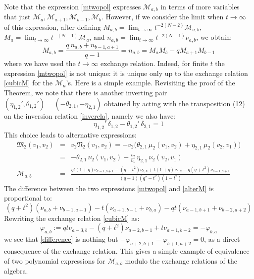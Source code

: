Note that the expression \eqref{mtwopol} expresses ${\mathcal M}_{a,b}$ in terms of more variables that 
just ${\mathcal M}_a,{\mathcal M}_{a+1},{\mathcal M}_{b-1},{\mathcal M}_{b}$. However, if we consider the limit
when $t\to \infty$ of this expression, after defining $M_{a,b}=\lim_{t\to \infty} t^{-2(N-2)}{\mathcal M}_{a,b}$,
$M_a=\lim_{t\to \infty} t^{-(N-1)} {\mathcal M}_a$, and $n_{a,b}=\lim_{t\to \infty} t^{-2(N-1)} \nu_{a,b}$, we obtain:
$$M_{a,b}=\frac{q \ n_{a,b}+n_{b-1,a+1}}{q-1}=n_{a,b}=M_aM_b-q M_{a+1}M_{b-1}$$
where we have used the $t\to \infty$ exchange relation. 
Indeed, for finite $t$ the expression \eqref{mtwopol} is not unique: 
it is unique only up to the exchange relation \eqref{cubicM}
for the ${\mathcal M}_n$'s. Here is a simple example.
Revisiting the proof of the Theorem, we note that there is another 
inverting pair $(\eta_{1,2}',\theta_{1,2}')=(-\theta_{2,1},-\eta_{2,1})$ obtained by acting with the transposition (12) 
on the inversion relation \eqref{inverela}, namely we also have:
$$\eta_{1,2}'\, \delta_{1,2}-\theta_{1,2}' \, \delta_{2,1}=1$$
This choice leads to alternative expressions:
\begin{eqnarray}
{\mathfrak M}_2(v_1,v_2)&=& v_2 {\mathfrak N}_2(v_1,v_2)=-v_2\Big(\theta_{2,1}\, \mu_2(v_1,v_2)+\eta_{2,1}\, \mu_2(v_2,v_1)\Big)\nonumber \\
&=& -\theta_{2,1} \, \nu_2(v_1,v_2)-\frac{v_2}{v_1}\,\eta_{2,1}\, \nu_2(v_2,v_1)\nonumber \\
{\mathcal M}_{a,b}&=&
\frac{q t(1+q)\nu_{a-1,b+1}-(q+t^2)\nu_{a,b}+t(1+q) \nu_{b,a}-q(q+t^2)\nu_{b-1,a+1}}{(q-1)(q^2-t^2)(1-t^2)}
\label{alterM}
\end{eqnarray}
The difference between the two expressions \eqref{mtwopol} and \eqref{alterM} is proportional to:
\begin{equation}\label{difference}
(q+t^2)(\nu_{a,b}+\nu_{b-1,a+1})-t(\nu_{a+1,b-1}+\nu_{b,a})-qt(\nu_{a-1,b+1}+\nu_{b-2,a+2})
\end{equation}
Rewriting the exchange relation \eqref{cubicM} as:
\begin{equation}\label{rewexch}\varphi_{a,b}:=qt \nu_{a-3,b}-(q+t^2)\nu_{a-2,b-1}+t \nu_{a-1,b-2}=-\varphi_{b,a}
\end{equation}
we see that \eqref{difference} is nothing but 
$-\varphi_{a+2,b+1}-\varphi_{b+1,a+2}=0$, as a direct consequence of the exchange relation.
This gives a simple example of equivalence of two polynomial expressions for ${\mathcal M}_{a,b}$
modulo the exchange relations of the algebra.

